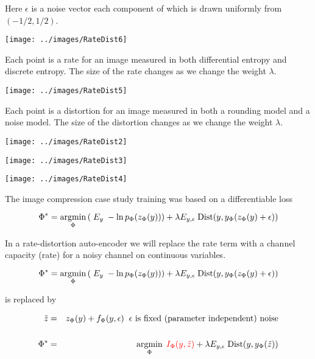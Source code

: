 {\vfill
Here $\epsilon$ is a noise vector each component of which is drawn uniformly from $(-1/2,1/2)$.


\bigskip
\centerline{\texttt{[image: ../images/RateDist6]}}

Each point is a rate for an image measured in both differential entropy and discrete entropy.  The size of the rate changes as we change the weight $\lambda$.


\centerline{\texttt{[image: ../images/RateDist5]}}

Each point is a distortion for an image measured in both a rounding model and a noise model.  The size of the distortion changes as we change the weight $\lambda$.


\bigskip
\centerline{\texttt{[image: ../images/RateDist2]}}


\bigskip
\centerline{\texttt{[image: ../images/RateDist3]}}


\bigskip
\centerline{\texttt{[image: ../images/RateDist4]}}


The image compression case study training was based on a differentiable loss

\vfill
$$\Phi^* = \operatorname*{argmin}_\Phi \left(\; E_y\;- \ln p_\Phi(z_\Phi(y))\right) + \lambda E_{y,\epsilon}\; \mathrm{Dist}(y,y_\Phi(z_\Phi(y) + \epsilon))$$

\vfill
In a rate-distortion auto-encoder we will replace the rate term with a channel capacity (rate) for a noisy channel on continuous variables.


$$\Phi^* = \operatorname*{argmin}_\Phi \left(\; E_y\;- \ln p_\Phi(z_\Phi(y))\right) + \lambda E_{y,\epsilon}\; \mathrm{Dist}(y,y_\Phi(z_\Phi(y) + \epsilon))$$

\vfill
is replaced by

\begin{eqnarray*}
\tilde{z} & = & z_\Phi(y) + f_\Phi(y,\epsilon) \;\;\mbox{$\epsilon$ is fixed (parameter independent) noise} \\
\\
\Phi^* & = & \operatorname*{argmin}_\Phi \;{\color{red} I_\Phi(y,\tilde{z})} + \lambda E_{y,\epsilon}\; \mathrm{Dist}(y,y_\Phi(\tilde{z}))
\end{eqnarray*}

}
